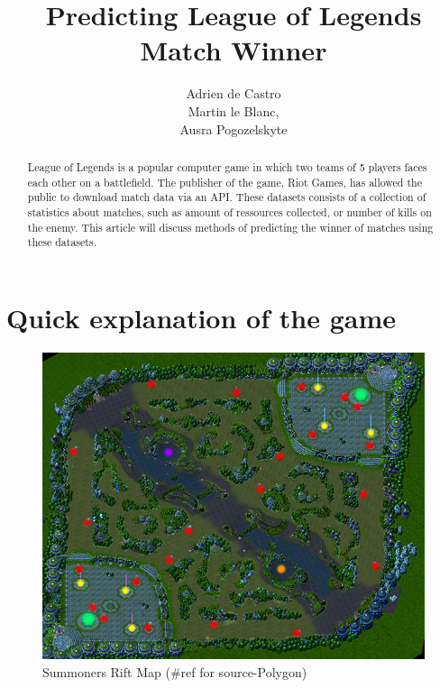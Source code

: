 \documentclass[a4paper,oneside,10pt]{article}
\begin{document}
\pagestyle{empty} %


\title{Predicting League of Legends Match Winner}
\author{Adrien de Castro\\
        Martin le Blanc, \\
        Ausra Pogozelskyte
        }

\maketitle
\begin{abstract}
League of Legends is a popular computer game in which two teams of 5 players faces each other on a battlefield. The publisher of the game, Riot Games, has allowed the public to download match data via an API. These datasets consists of a collection of statistics about matches, such as amount of ressources collected, or number of kills on the enemy. This article will discuss methods of predicting the winner of matches using these datasets.
\end{abstract}

\clearpage

\pagestyle{plain} %

\section{Quick explanation of the game}
\begin{figure}[h]
    \centering
    \includegraphics[scale =0.55]{Map.jpg}
    \caption{Summoners Rift Map (\#ref for source-Polygon)}
    \label{fig:map}
\end{figure}
\end{document}
